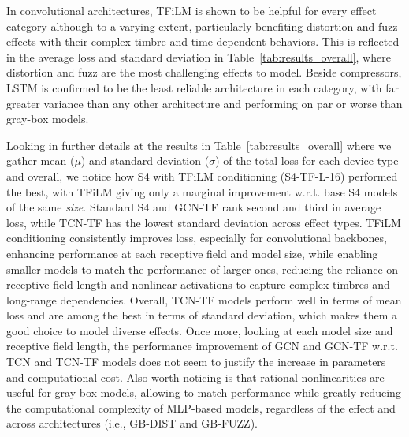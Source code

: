 In convolutional architectures, TFiLM is shown to be helpful for every effect category although to a varying extent, particularly benefiting distortion and fuzz effects with their complex timbre and time-dependent behaviors.
This is reflected in the average loss and standard deviation in Table~\ref{tab:results_overall}, where distortion and fuzz are the most challenging effects to model.
Beside compressors, LSTM is confirmed to be the least reliable architecture in each category, with far greater variance than any other architecture and performing on par or worse than gray-box models.

Looking in further details at the results in Table~\ref{tab:results_overall} where we gather mean ($\mu$) and standard deviation ($\sigma$) of the total loss for each device type and overall, we notice how S4 with TFiLM conditioning (S4-TF-L-16) performed the best, with TFiLM giving only a marginal improvement w.r.t. base S4 models of the same \textit{size}.
Standard S4 and GCN-TF rank second and third in average loss, while TCN-TF has the lowest standard deviation across effect types.
TFiLM conditioning consistently improves loss, especially for convolutional backbones, enhancing performance at each receptive field and model size, while enabling smaller models to match the performance of larger ones, reducing the reliance on receptive field length and nonlinear activations to capture complex timbres and long-range dependencies.
Overall, TCN-TF models perform well in terms of mean loss and are among the best in terms of standard deviation, which makes them a good choice to model diverse effects.
Once more, looking at each model size and receptive field length, the performance improvement of GCN and GCN-TF w.r.t. TCN and TCN-TF models does not seem to justify the increase in parameters and computational cost.
Also worth noticing is that rational nonlinearities are useful for gray-box models, allowing to match performance while greatly reducing the computational complexity of MLP-based models, regardless of the effect and across architectures (i.e., GB-DIST and GB-FUZZ).

